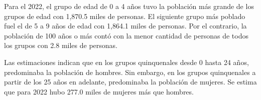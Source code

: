 \justifying Para el 2022, el grupo de edad de 0 a 4 años tuvo la población más grande de los grupos de edad con 1,870.5 miles de personas. El siguiente grupo más poblado fuel el de 5 a 9 años de edad con 1,864.1 miles de personas. Por el contrario,  la población de 100 años o más contó con la menor cantidad de personas de todos los grupos con 2.8 miles de personas. 

Las estimaciones indican que en los grupos quinquenales desde 0 hasta 24 años, predominaba la población de hombres. Sin embargo, en los grupos quinquenales a partir de los 25 años en adelante, predominaba la población de mujeres. Se estima que para 2022 hubo 277.0 miles de mujeres más que hombres.